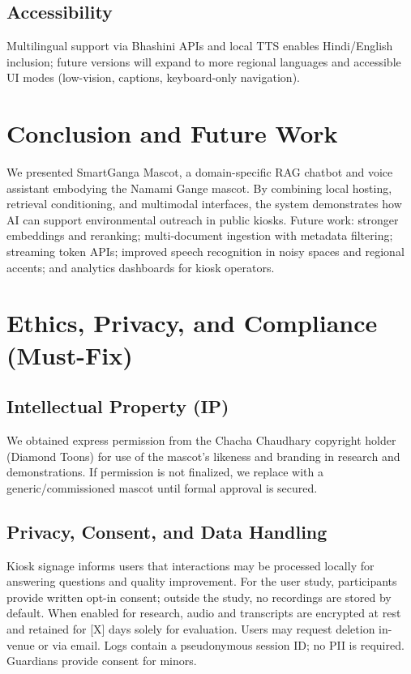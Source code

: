 \documentclass[conference]{IEEEtran}
\begin{document}
\subsection{Accessibility}
Multilingual support via Bhashini APIs and local TTS enables Hindi/English inclusion; future versions will expand to more regional languages and accessible UI modes (low-vision, captions, keyboard-only navigation).

\section{Conclusion and Future Work}
We presented SmartGanga Mascot, a domain-specific RAG chatbot and voice assistant embodying the Namami Gange mascot. By combining local hosting, retrieval conditioning, and multimodal interfaces, the system demonstrates how AI can support environmental outreach in public kiosks. Future work: stronger embeddings and reranking; multi-document ingestion with metadata filtering; streaming token APIs; improved speech recognition in noisy spaces and regional accents; and analytics dashboards for kiosk operators.

\section{Ethics, Privacy, and Compliance (Must-Fix)}
\subsection{Intellectual Property (IP)}
We obtained express permission from the Chacha Chaudhary copyright holder (Diamond Toons) for use of the mascot’s likeness and branding in research and demonstrations. If permission is not finalized, we replace with a generic/commissioned mascot until formal approval is secured.

\subsection{Privacy, Consent, and Data Handling}
Kiosk signage informs users that interactions may be processed locally for answering questions and quality improvement. For the user study, participants provide written opt-in consent; outside the study, no recordings are stored by default. When enabled for research, audio and transcripts are encrypted at rest and retained for [X] days solely for evaluation. Users may request deletion in-venue or via email. Logs contain a pseudonymous session ID; no PII is required. Guardians provide consent for minors.
\end{document}

